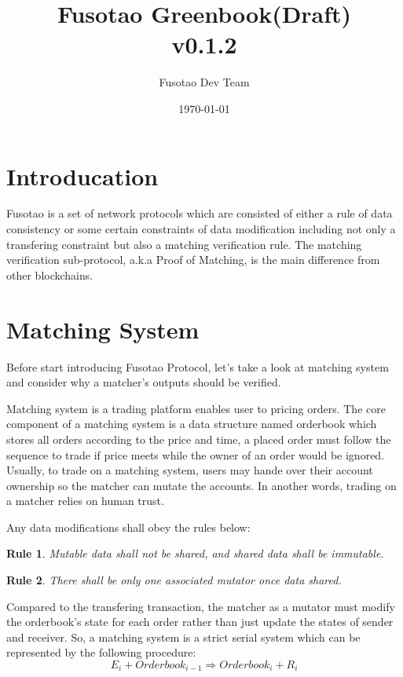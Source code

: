 \documentclass[a4paper,12pt]{article}
\author{Fusotao Dev Team}
\date{\today}
\title{Fusotao Greenbook(Draft) \\ {\small v0.1.2}}
\begin{document}
\maketitle
\clearpage


\section{Introducation}
\label{sec:org0c6ec30}
Fusotao is a set of network protocols which are consisted of either a rule of data consistency or some certain constraints of data modification including not only a transfering constraint but also a matching verification rule. The matching verification sub-protocol, a.k.a Proof of Matching, is the main difference from other blockchains.

\section{Matching System}
\label{sec:org1040c84}
Before start introducing Fusotao Protocol, let's take a look at matching system and consider why a matcher's outputs should be verified.

Matching system is a trading platform enables user to pricing orders. The core component of a matching system is a data structure named orderbook which stores all orders according to the price and time, a placed order must follow the sequence to trade if price meets while the owner of an order would be ignored. Usually, to trade on a matching system, users may hande over their account ownership so the matcher can mutate the accounts. In another words, trading on a matcher relies on human trust.

\newtheorem{theorem}{Rule}
Any data modifications shall obey the rules below:
\begin{theorem}
Mutable data shall not be shared, and shared data shall be immutable.
\end{theorem}
\begin{theorem}
There shall be only one associated mutator once data shared.
\end{theorem}

Compared to the transfering transaction, the matcher as a mutator must modify the orderbook's state for each order rather than just update the states of sender and receiver. So, a matching system is a strict serial system which can be represented by the following procedure:
\begin{equation*}
    E_{i} + Orderbook_{i-1} \Rightarrow Orderbook_{i} + R_{i}
\end{equation*}
\end{document}
